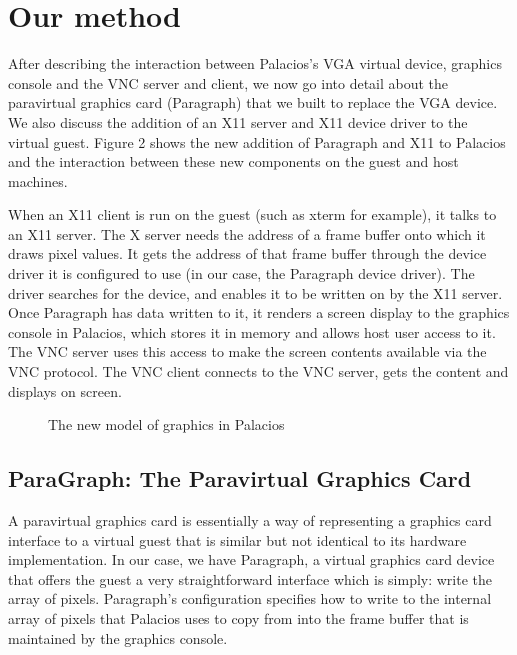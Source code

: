 \documentclass{acm_proc_article-sp}
\begin{document}
\section{Our method}
After describing the interaction between Palacios's VGA virtual device, graphics console and the VNC server and client, we now go into detail
about the paravirtual graphics card (Paragraph) that we built to replace the VGA 
device. We also discuss the addition of an X11 server and X11 device driver to
the virtual guest. Figure 2 shows the new addition of Paragraph and X11 to
Palacios and the interaction between these new components on the guest and host
machines. 
\par
When an X11 client is run on the guest (such as xterm for example), it talks to
an X11 server. The X server needs the address of a frame buffer onto which it
draws pixel values. It gets the address of that frame buffer through the device
driver it is configured to use (in our case, the Paragraph device driver). The 
driver searches for the device, and enables it to be written on by the X11
server.  Once Paragraph has data written to it, it renders a
screen display to the graphics console in Palacios, which stores it in memory
and allows host user access to it. The VNC server uses this access to make the 
screen contents available via the VNC protocol. The VNC client connects to the 
VNC server, gets the content and displays on screen.
\begin{figure}[h]                                              
\centering                                                     
{}                   
\caption{The new model of graphics in Palacios}   
\end{figure}                                                   
\subsection{ParaGraph: The Paravirtual Graphics Card}
A paravirtual graphics card is essentially a way of representing a graphics card
interface to a virtual guest that is similar but not identical to its hardware
implementation. In our case, we have Paragraph, a virtual graphics card device
that offers the guest a very straightforward interface which is simply: write
the array of pixels. Paragraph's configuration specifies how to write to the
internal array of pixels that Palacios uses to copy from into the frame buffer
that is maintained by the graphics console. \\
\end{document}
